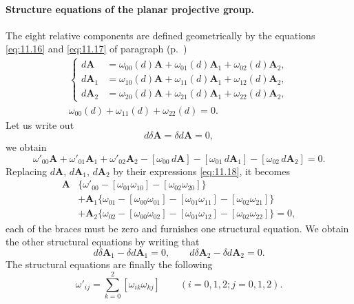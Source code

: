 \paragraph{Structure equations of the planar projective group.}
\label{sec:159}
The eight relative components are defined geometrically by the equations \eqref{eq:11.16} and \eqref{eq:11.17} of paragraph  (p.~\pageref{sec:73})
\begin{gather}
  \label{eq:11.18}
  \left\{
    \begin{aligned}
      d\mathbf{A}_{\phantom{0}}&=\omega_{00}(d)\mathbf{A}+\omega_{01}(d)\mathbf{A}_{1}+\omega_{02}(d)\mathbf{A}_{2},\\
      d\mathbf{A}_{{1}}&=\omega_{10}(d)\mathbf{A}+\omega_{11}(d)\mathbf{A}_{1}+\omega_{12}(d)\mathbf{A}_{2},\\
      d\mathbf{A}_{{2}}&=\omega_{20}(d)\mathbf{A}+\omega_{21}(d)\mathbf{A}_{1}+\omega_{22}(d)\mathbf{A}_{2},
    \end{aligned}
  \right.\\
  \label{eq:11.19}
  \omega_{00}(d)+\omega_{11}(d)+\omega_{22}(d)=0.
\end{gather}
Let us write out
\[
d\delta\mathbf{A}=\delta d\mathbf{A}=0,
\]
we obtain
\[
\omega'_{00}\mathbf{A}+\omega'_{01}\mathbf{A}_{1}+\omega'_{02}\mathbf{A}_{2}-[\omega_{00}\,d\mathbf{A}]-[\omega_{01}\,d\mathbf{A}_{1}]-[\omega_{02}\,d\mathbf{A}_{2}]=0.
\]
Replacing $d\mathbf{A}$, $d\mathbf{A}_{1}$, $d\mathbf{A}_{2}$ by their expressions \eqref{eq:11.18}, it becomes
\begin{align*}
  \mathbf{A}{}&{}\{{}\omega'_{00}-[\omega_{01}\omega_{10}]-[\omega_{02}\omega_{20}]\}\\
  &+\mathbf{A}_{1}\{\omega_{01}-[\omega_{00}\omega_{01}]-[\omega_{01}\omega_{11}]-[\omega_{02}\omega_{21}]\}\\
  &+\mathbf{A}_{2}\{\omega_{02}-[\omega_{00}\omega_{02}]-[\omega_{01}\omega_{12}]-[\omega_{02}\omega_{22}]\}=0,
\end{align*}
each of the braces must be zero and furnishes one structural equation. We obtain the other structural equations by writing that
\[
d\delta\mathbf{A}_{1}-\delta d\mathbf{A}_{1}=0,\qquad
d\delta\mathbf{A}_{2}-\delta d\mathbf{A}_{2}=0.
\]
The structural equations are finally the following
\begin{equation}
  \label{eq:11.20}
  \omega'_{ij}=\sum_{k=0}^{2}[\omega_{ik}\omega_{kj}]\qquad(i=0,1,2;j=0,1,2).
\end{equation}


